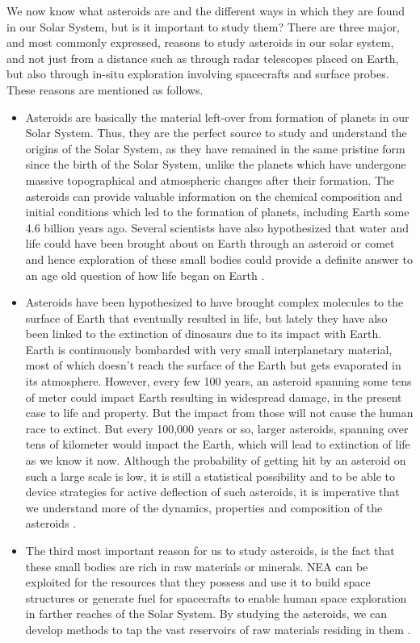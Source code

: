 We now know what asteroids are and the different ways in which they are found in our Solar System, but is it important to study them? There are three major, and most commonly expressed, reasons to study asteroids in our solar system, and not just from a distance such as through radar telescopes placed on Earth, but also through in-situ exploration involving spacecrafts and surface probes. These reasons are mentioned as follows.
\begin{itemize}
\item Asteroids are basically the material left-over from formation of planets in our Solar System. Thus, they are the perfect source to study and understand the origins of the Solar System, as they have remained in the same pristine form since the birth of the Solar System, unlike the planets which have undergone massive topographical and atmospheric changes after their formation. The asteroids can provide valuable information on the chemical composition and initial conditions which led to the formation of planets, including Earth some 4.6 billion years ago. Several scientists have also hypothesized that water and life could have been brought about on Earth through an asteroid or comet and hence exploration of these small bodies could provide a definite answer to an age old question of how life began on Earth \cite{whyAsteroidsWeb}.
\item Asteroids have been hypothesized to have brought complex molecules to the surface of Earth that eventually resulted in life, but lately they have also been linked to the extinction of dinosaurs due to its impact with Earth. Earth is continuously bombarded with very small interplanetary material, most of which doesn't reach the surface of the Earth but gets evaporated in its atmosphere. However, every few 100 years, an asteroid spanning some tens of meter could impact Earth resulting in widespread damage, in the present case to life and property. But the impact from those will not cause the human race to extinct. But every 100,000 years or so, larger asteroids, spanning over tens of kilometer would impact the Earth, which will lead to extinction of life as we know it now. Although the probability of getting hit by an asteroid on such a large scale is low, it is still a statistical possibility and to be able to device strategies for active deflection of such asteroids, it is imperative that we understand more of the dynamics, properties and composition of the asteroids \cite{whyAsteroidsWeb}.
\item The third most important reason for us to study asteroids, is the fact that these small bodies are rich in raw materials or minerals. \gls{NEA} can be exploited for the resources that they possess and use it to build space structures or generate fuel for spacecrafts to enable human space exploration in farther reaches of the Solar System. By studying the asteroids, we can develop methods to tap the vast reservoirs of raw materials residing in them \cite{whyAsteroidsWeb}.
\end{itemize}

